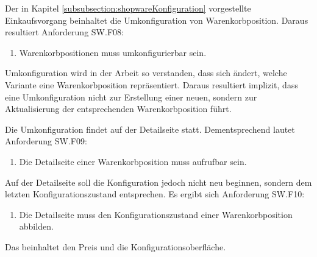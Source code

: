 \documentclass[12pt,a4paper,bibliography=totocnumbered,listof=totoc]{scrartcl}
\begin{document}
Der in Kapitel \ref{subsubsection:shopwareKonfiguration} vorgestellte Einkaufsvorgang beinhaltet die Umkonfiguration von Warenkorbposition. Daraus resultiert Anforderung SW.F08: 
\begin{enumerate}[SW.F08:]\bfseries
\item Warenkorbpositionen muss umkonfigurierbar sein.
\end{enumerate}
Umkonfiguration wird in der Arbeit so verstanden, dass sich ändert, welche Variante eine Warenkorbposition repräsentiert. Daraus resultiert implizit, dass eine Umkonfiguration nicht zur Erstellung einer neuen, sondern zur Aktualisierung der entsprechenden Warenkorbposition führt.

Die Umkonfiguration findet auf der Detailseite statt. Dementsprechend lautet Anforderung SW.F09: 
\begin{enumerate}[SW.F09:]\bfseries
\item Die Detailseite einer Warenkorbposition muss aufrufbar sein.
\end{enumerate}
Auf der Detailseite soll die Konfiguration jedoch nicht neu beginnen, sondern dem letzten Konfigurationszustand entsprechen. Es ergibt sich Anforderung SW.F10:
\begin{enumerate}[SW.F10:]\bfseries
\item Die Detailseite muss den Konfigurationszustand einer Warenkorbposition abbilden.
\end{enumerate}
Das beinhaltet den Preis und die Konfigurationsoberfläche.
\end{document}
